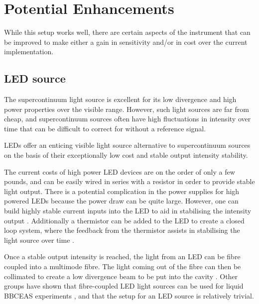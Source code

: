 \section{Potential Enhancements}\label{sec:bbceas_enhance}

While this setup works well, there are certain aspects of the instrument that
can be improved to make either a gain in sensitivity and/or in cost over the
current implementation.

\subsection{LED source}\label{sec:bbceas_led}


The supercontinuum light source is excellent for its low divergence and high
power properties over the visible range. However, such light sources are far
from cheap, and supercontinuum sources often have high fluctuations in
intensity over time that can be difficult to correct for without a reference
signal.

\acp{LED} offer an enticing visible light source alternative to supercontinuum
sources on the basis of their exceptionally low cost and stable output
intensity stability.

The current costs of high power \ac{LED} devices are on the order of only a few
pounds, and can be easily wired in series with a resistor in order to provide
stable light output. There is a potential complication in the power supplies
for high powered \acp{LED} because the power draw can be quite large.  However,
one can build highly stable current inputs into the \ac{LED} to aid in
stabilising the intensity output \cite{patent_const_current}. Additionally a
thermistor can be added to the \ac{LED} to create a closed loop system, where
the feedback from the thermistor assists in stabilising the light source over
time \cite{Wieman:2000vd}.

Once a stable output intensity is reached, the light from an \ac{LED} can be
fibre coupled into a multimode fibre. The light coming out of the fibre can
then be collimated to create a low divergence beam to be put into the cavity
\cite{Berden:2009wk}.  Other groups have shown that fibre-coupled \ac{LED}
light sources can be used for liquid \ac{BBCEAS} experiments
\cite{Islam:2007ea,Seetohul:2009du}, and that the setup for an \ac{LED} source
is relatively trivial.

